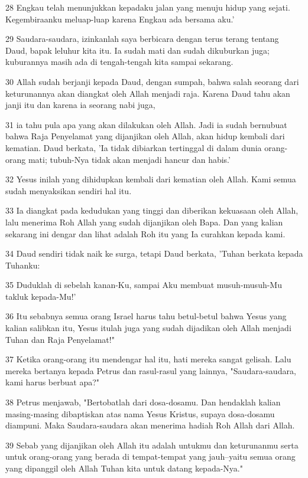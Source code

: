 \par 28 Engkau telah menunjukkan kepadaku jalan yang menuju hidup yang sejati. Kegembiraanku meluap-luap karena Engkau ada bersama aku.'
\par 29 Saudara-saudara, izinkanlah saya berbicara dengan terus terang tentang Daud, bapak leluhur kita itu. Ia sudah mati dan sudah dikuburkan juga; kuburannya masih ada di tengah-tengah kita sampai sekarang.
\par 30 Allah sudah berjanji kepada Daud, dengan sumpah, bahwa salah seorang dari keturunannya akan diangkat oleh Allah menjadi raja. Karena Daud tahu akan janji itu dan karena ia seorang nabi juga,
\par 31 ia tahu pula apa yang akan dilakukan oleh Allah. Jadi ia sudah bernubuat bahwa Raja Penyelamat yang dijanjikan oleh Allah, akan hidup kembali dari kematian. Daud berkata, 'Ia tidak dibiarkan tertinggal di dalam dunia orang-orang mati; tubuh-Nya tidak akan menjadi hancur dan habis.'
\par 32 Yesus inilah yang dihidupkan kembali dari kematian oleh Allah. Kami semua sudah menyaksikan sendiri hal itu.
\par 33 Ia diangkat pada kedudukan yang tinggi dan diberikan kekuasaan oleh Allah, lalu menerima Roh Allah yang sudah dijanjikan oleh Bapa. Dan yang kalian sekarang ini dengar dan lihat adalah Roh itu yang Ia curahkan kepada kami.
\par 34 Daud sendiri tidak naik ke surga, tetapi Daud berkata, 'Tuhan berkata kepada Tuhanku:
\par 35 Duduklah di sebelah kanan-Ku, sampai Aku membuat musuh-musuh-Mu takluk kepada-Mu!'
\par 36 Itu sebabnya semua orang Israel harus tahu betul-betul bahwa Yesus yang kalian salibkan itu, Yesus itulah juga yang sudah dijadikan oleh Allah menjadi Tuhan dan Raja Penyelamat!"
\par 37 Ketika orang-orang itu mendengar hal itu, hati mereka sangat gelisah. Lalu mereka bertanya kepada Petrus dan rasul-rasul yang lainnya, "Saudara-saudara, kami harus berbuat apa?"
\par 38 Petrus menjawab, "Bertobatlah dari dosa-dosamu. Dan hendaklah kalian masing-masing dibaptiskan atas nama Yesus Kristus, supaya dosa-dosamu diampuni. Maka Saudara-saudara akan menerima hadiah Roh Allah dari Allah.
\par 39 Sebab yang dijanjikan oleh Allah itu adalah untukmu dan keturunanmu serta untuk orang-orang yang berada di tempat-tempat yang jauh--yaitu semua orang yang dipanggil oleh Allah Tuhan kita untuk datang kepada-Nya."
